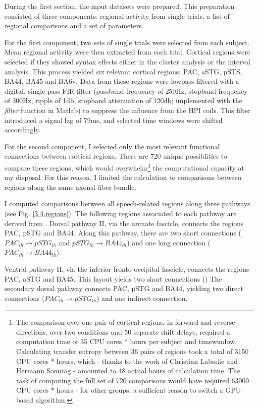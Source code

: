 During the first section, the input datasets were prepared.
This preparation consisted of three components: regional activity from single trials, a list of regional comparisons and a set of parameters.

For the first component, two sets of single trials were selected from each subject.
Mean regional activity were then extracted from each trial.
Cortical regions were selected if they showed syntax effects either in the cluster analysis or the interval analysis.
This process yielded six relevant cortical regions: PAC, aSTG, pSTS, BA44, BA45 and BA6v.
Data from these regions were lowpass filtered with a digital, single-pass FIR filter (passband frequency of 250Hz, stopband frequency of 300Hz, ripple of 1db, stopband attenuation of 120db; implemented with the \emph{filter} function in Matlab) to suppress the influence from the HPI coils.
This filter introduced a signal lag of 79ms, and selected time windows were shifted accordingly.

For the second component, I selected only the most relevant functional connections between cortical regions.
There are 720 unique possiblities to compare these regions, which would overwhelm\footnote{The comparison over one pair of cortical regions, in forward and reverse directions, over two conditions and 50 separate shift delays, required a computation time of 35 CPU cores * hours per subject and timewindow. Calculating transfer entropy between 36 pairs of regions took a total of 3150 CPU cores * hours, which - thanks to the work of Christian Labadie and Hermann Sonntag - amounted to 48 actual hours of calculation time. The task of computing the full set of 720 comparisons would have required 63000 CPU cores * hours - for other groups, a sufficient reason to switch a GPU-based algorithm\cite{3.4.gpuTE}.} the computational capacity at my disposal. For this reason, I limited the calculation to comparisons between regions along the same axonal fiber bundle.

I computed comparisons between all speech-related regions along three pathways (see Fig. \ref{3.4.regions}).
The following regions associated to each pathway are derived from \cite{1.1.pathways}.
Dorsal pathway II, via the arcuate fascicle, connects the regions PAC, pSTG and BA44.
Along this pathway, there are two short connections ($PAC_{lh} \rightarrow pSTG_{lh}$ and $pSTG_{lh} \rightarrow BA44_{lh}$) and one long connection ($PAC_{lh} \rightarrow BA44_{lh}$).

Ventral pathway II, via the inferior fronto-occipital fascicle, connects the regions PAC, aSTG and BA45.
This layout yields two short connections ()
The secondary dorsal pathway connects PAC, pSTG and BA44, yielding two direct connections ($PAC_{lh} \rightarrow pSTG_{lh}$) and one indirect connection.

